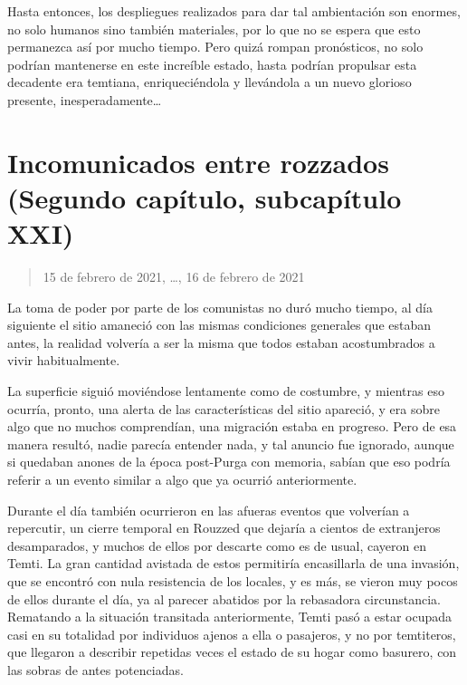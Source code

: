 \documentclass[
  spanish,
]{book}
\begin{document}
Hasta entonces, los despliegues realizados para dar tal ambientación son enormes, no solo humanos sino también materiales, por lo que no se espera que esto permanezca así por mucho tiempo. Pero quizá rompan pronósticos, no solo podrían mantenerse en este increíble estado, hasta podrían propulsar esta decadente era temtiana, enriqueciéndola y llevándola a un nuevo glorioso presente, inesperadamente\ldots{}

\hypertarget{incomunicados-entre-rozzados-segundo-capuxedtulo-subcapuxedtulo-xxi}{%
\section{Incomunicados entre rozzados (Segundo capítulo, subcapítulo XXI)}\label{incomunicados-entre-rozzados-segundo-capuxedtulo-subcapuxedtulo-xxi}}

\begin{quote}
15 de febrero de 2021, \ldots, 16 de febrero de 2021
\end{quote}

La toma de poder por parte de los comunistas no duró mucho tiempo, al día siguiente el sitio amaneció con las mismas condiciones generales que estaban antes, la realidad volvería a ser la misma que todos estaban acostumbrados a vivir habitualmente.

La superficie siguió moviéndose lentamente como de costumbre, y mientras eso ocurría, pronto, una alerta de las características del sitio apareció, y era sobre algo que no muchos comprendían, una migración estaba en progreso. Pero de esa manera resultó, nadie parecía entender nada, y tal anuncio fue ignorado, aunque si quedaban anones de la época post-Purga con memoria, sabían que eso podría referir a un evento similar a algo que ya ocurrió anteriormente.

Durante el día también ocurrieron en las afueras eventos que volverían a repercutir, un cierre temporal en Rouzzed que dejaría a cientos de extranjeros desamparados, y muchos de ellos por descarte como es de usual, cayeron en Temti. La gran cantidad avistada de estos permitiría encasillarla de una invasión, que se encontró con nula resistencia de los locales, y es más, se vieron muy pocos de ellos durante el día, ya al parecer abatidos por la rebasadora circunstancia. Rematando a la situación transitada anteriormente, Temti pasó a estar ocupada casi en su totalidad por individuos ajenos a ella o pasajeros, y no por temtiteros, que llegaron a describir repetidas veces el estado de su hogar como basurero, con las sobras de antes potenciadas.
\end{document}
